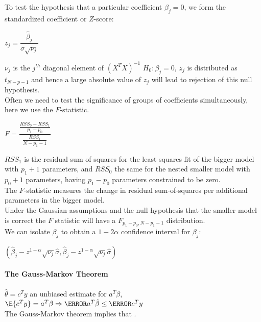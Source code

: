 To test the hypothesis that a particular coefficient $\beta_{j}=0$, we
form the standardized coefficient or $Z$-score:
\begin{center}
	$z_{j}=\dfrac{\hat{\beta}_{j}}{\hat{\sigma}\sqrt{\nu_{j}}}$
\end{center}
$\nu_{j}$ is the $j^{th}$ diagonal element of $\left(X^{T}X\right)^{-1}$
$H_{0}: \beta_{j}=0$, $z_{j}$ is distributed as $t_{N-p-1}$ and hence
a large absolute value of $z_{j}$ will lead to rejection of this 
null hypothesis.\\
Often we need to test the significance of groups of coefficients 
simultaneously, here we use the $F$-statistic.
\begin{center}
	$F=\dfrac{\frac{RSS_{0}-RSS_{1}}{p_{1}-p_{0}}}{\frac{RSS_{1}}{N-p_{1}-1}}$
\end{center}
$RSS_{1}$ is the residual sum of squares for the least squares fit of 
the bigger model with $p_{1}+1$ parameters, and $RSS_{0}$ the same for
the nested smaller model with $p_{0}+1$ parameters, having $p_{1}-
p_{0}$ parameters constrained to be zero.\\
The $F$-statistic measures the change in residual sum-of-squares per 
additional parameters in the bigger model.\\
Under the Gaussian assumptions and the null hypothesis that the smaller
model is correct the $F$ statistic will have a $F_{p_{1}-p_{0},N-p_{1}-1}$ distribution.\\
We can isolate $\beta_{j}$ to obtain a $1-2\alpha$ confidence interval
for $\beta_{j}$:
\begin{center}
	$\left(\hat{\beta}_{j}-z^{1-\alpha}\sqrt{\nu_{j}}\hat{\sigma}, \hat{\beta}_{j}-z^{1-\alpha}\sqrt{\nu_{j}}\hat{\sigma}\right)$
\end{center}
\paragraph{The Gauss-Markov Theorem}
$\hat{\theta}=c^{T}y$ an unbiased estimate for $a^{T}\beta$,
$\E{c^{T}y}=a^{T}\beta\Rightarrow \V{a^{T}\hat{\beta}}\leq\V{c^{T}y}$\\
The Gauss-Markov theorem implies that .

